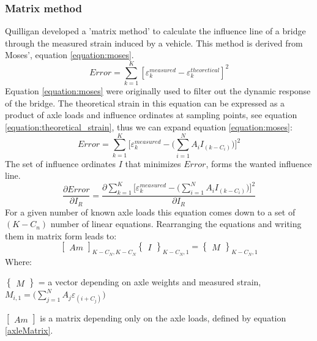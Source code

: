 \subsubsection{Matrix method}
Quilligan \cite{Quilligan} developed a 'matrix method' to calculate the influence line of a bridge through the measured strain induced by a vehicle. This method is derived from Moses', equation \ref{equation:moses}.
\begin{equation}
Error = \sum_{k = 1}^{K} [\varepsilon_{k}^{measured} - \varepsilon_{k}^{theoretical}]^2
\label{equation:moses}
\end{equation}
Equation \ref{equation:moses} were originally used to filter out the dynamic response of the bridge.
The theoretical strain in this equation can be expressed as a product of axle loads and influence ordinates at sampling points, see equation \ref{equation:theoretical_strain}, thus we can expand equation \ref{equation:moses}:
\begin{equation}
Error = \sum_{k = 1}^{K} \Big[\varepsilon_{k}^{measured} - \Big(\sum_{i = 1}^{N} A_i I_{(k-C_i)}\Big)\Big]^2
\label{equation:moses_expanded}
\end{equation}
The set of influence ordinates $I$ that minimizes $Error$, forms the wanted influence line.
\begin{equation}
\frac{\partial Error}{\partial I_R} = \frac{\partial \sum_{k = 1}^{K} \Big[\varepsilon_{k}^{measured} - \Big(\sum_{i = 1}^{N} A_i I_{(k-C_i)}\Big)\Big]^2}{\partial I_R}
\end{equation}
For a given number of known axle loads this equation comes down to a set of $(K - C_n)$ number of linear equations. Rearranging the equations and writing them in matrix form leads to:
\begin{equation}
\begin{bmatrix} Am \end{bmatrix}_{K-C_N, K-C_N} \begin{Bmatrix} I \end{Bmatrix}_{K-C_N, 1} = \begin{Bmatrix} M \end{Bmatrix}_{K-C_N, 1}
\label{equation:matrixForm}
\end{equation}
Where:
\begin{description}
\item $\begin{Bmatrix} M \end{Bmatrix}$ = a vector depending on axle weights and measured strain, $M_{i, 1} = \Big(\sum_{j = 1}^{N} A_j \varepsilon_{(i+C_j)}\Big)$
\item $\begin{bmatrix} Am \end{bmatrix}$ is a matrix depending only on the axle loads, defined by equation \ref{axleMatrix}.
\end{description}
